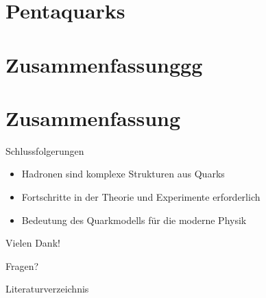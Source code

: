 \documentclass[aspectratio=169]{beamer} %
\begin{document}
    \section{Pentaquarks}
    \section{Zusammenfassunggg}
    
    \section{Zusammenfassung}
    \begin{frame}{Schlussfolgerungen}
        \begin{itemize}
            \item Hadronen sind komplexe Strukturen aus Quarks
            \item Fortschritte in der Theorie und Experimente erforderlich
            \item Bedeutung des Quarkmodells für die moderne Physik
        \end{itemize}
    \end{frame}
    
    \begin{frame}{Vielen Dank!}
        \begin{center}
            \Huge Fragen?
        \end{center}
    \end{frame}

    \begin{frame}{Literaturverzeichnis}
   \printbibliography[nottype=unpublished]
    \end{frame}
\end{document}
